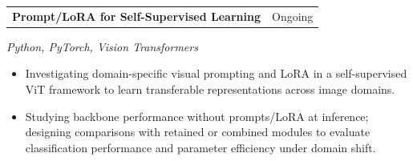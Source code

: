 \documentclass[letterpaper,10pt]{article}
\makeatletter
\newcommand{\entry}[2]{%
  \noindent
  \begin{tabularx}{\linewidth}
    {@{}>{\raggedright\arraybackslash}X@{\hspace{6pt}}r@{}}
    \textbf{#1} & #2
  \end{tabularx}\par
}
\newcommand{\bullets}{
  \begin{itemize}[
    leftmargin=1.2em,
    topsep=2pt,
    itemsep=1pt,
    parsep=0pt,
    partopsep=0pt
  ]
}
\newcommand{\finishbullets}{
  \end{itemize}
}
\makeatother
\begin{document}
\entry
  {Prompt/LoRA for Self-Supervised Learning}
  {Ongoing}

\textit{Python, PyTorch, Vision Transformers}

\bullets

  \item Investigating domain-specific visual prompting and LoRA in a self-supervised ViT framework to learn transferable representations across image domains.

  \item Studying backbone performance without prompts/LoRA at inference; designing comparisons with retained or combined modules to evaluate classification performance and parameter efficiency under domain shift.

\finishbullets
\end{document}
